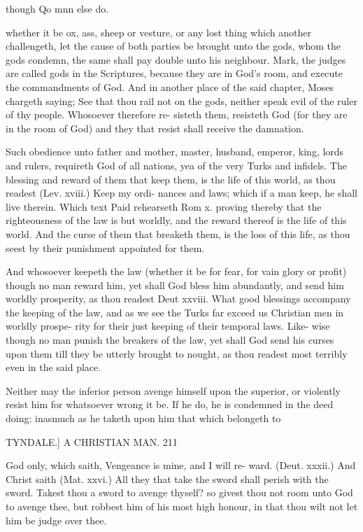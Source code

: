 \documentclass{custom}
\begin{document}
though Qo 
mnn else 
do. 

whether it be ox, ass, sheep or vesture, or any lost thing 
which another challengeth, let the cause of both parties be 
brought unto the gods, whom the gods condemn, the 
same shall pay double unto his neighbour. Mark, the 
judges are called gods in the Scriptures, because they are 
in God's room, and execute the commandments of God. 
And in another place of the said chapter, Moses chargeth 
saying; See that thou rail not on the gods, neither speak 
evil of the ruler of thy people. Whosoever therefore re- 
sisteth them, resisteth God (for they are in the room of 
God) and they that resist shall receive the damnation. 

Such obedience unto father and mother, master, 
husband, emperor, king, lords and rulers, requireth God 
of all nations, yea of the very Turks and infidels. The 
blessing and reward of them that keep them, is the life of 
this world, as thou readest (Lev. xviii.) Keep my ordi- 
nances and laws; which if a man keep, he shall live 
therein. Which text Paid rehearseth Rom x. proving 
thereby that the righteousness of the law is but worldly, 
and the reward thereof is the life of this world. And the 
curse of them that breaketh them, is the loss of this life, 
as thou seest by their punishment appointed for them.

And whosoever keepeth the law (whether it be for fear, 
for vain glory or profit) though no man reward him, yet 
shall God bless him abundantly, and send him worldly 
prosperity, as thou readest Deut xxviii. What good 
blessings accompany the keeping of the law, and as we 
see the Turks far exceed us Christian men in worldly prospe-
rity for their just keeping of their temporal laws. Like- 
wise though no man punish the breakers of the law, yet 
shall God send his curses upon them till they be utterly 
brought to nought, as thou readest most terribly even in 
the said place.

Neither may the inferior person avenge himself upon 
the superior, or violently resist him for whatsoever wrong 
it be. If he do, he is condemned in the deed doing: 
inasmuch as he taketh upon him that which belongeth to 


TYNDALE.]
A CHRISTIAN MAN.
211

God only, which saith, Vengeance is mine, and I will re- 
ward. (Deut. xxxii.) And Christ saith (Mat. xxvi.) All 
they that take the sword shall perish with the sword. 
Takest thou a sword to avenge thyself? so givest thou not 
room unto God to avenge thee, but robbest him of his 
most high honour, in that thou wilt not let him be judge 
over thee. 
\end{document}
